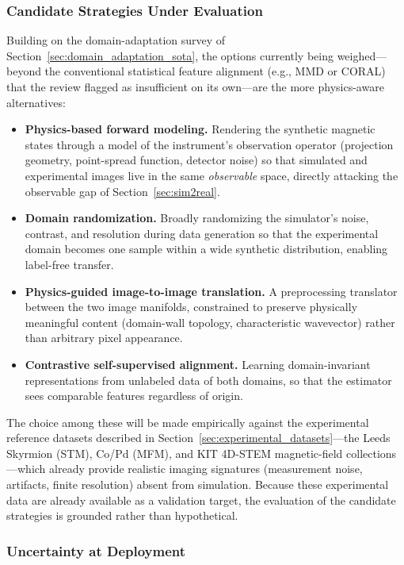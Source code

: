 \documentclass[letterpaper, 12, one column]{article}
\begin{document}
{\subsubsection{Candidate Strategies Under Evaluation}

Building on the domain-adaptation survey of Section~\ref{sec:domain_adaptation_sota}, the options currently being weighed---beyond the conventional statistical feature alignment (e.g., MMD or CORAL) that the review flagged as insufficient on its own---are the more physics-aware alternatives:
\begin{itemize}
    \item[--] \textbf{Physics-based forward modeling.} Rendering the synthetic magnetic states through a model of the instrument's observation operator (projection geometry, point-spread function, detector noise) so that simulated and experimental images live in the same \emph{observable} space, directly attacking the observable gap of Section~\ref{sec:sim2real}.
    \item[--] \textbf{Domain randomization.} Broadly randomizing the simulator's noise, contrast, and resolution during data generation so that the experimental domain becomes one sample within a wide synthetic distribution, enabling label-free transfer.
    \item[--] \textbf{Physics-guided image-to-image translation.} A preprocessing translator between the two image manifolds, constrained to preserve physically meaningful content (domain-wall topology, characteristic wavevector) rather than arbitrary pixel appearance.
    \item[--] \textbf{Contrastive self-supervised alignment.} Learning domain-invariant representations from unlabeled data of both domains, so that the estimator sees comparable features regardless of origin.
\end{itemize}

The choice among these will be made empirically against the experimental reference datasets described in Section~\ref{sec:experimental_datasets}---the Leeds Skyrmion (STM), Co/Pd (MFM), and KIT 4D-STEM magnetic-field collections---which already provide realistic imaging signatures (measurement noise, artifacts, finite resolution) absent from simulation. Because these experimental data are already available as a validation target, the evaluation of the candidate strategies is grounded rather than hypothetical.}

\subsubsection{Uncertainty at Deployment}
\end{document}
